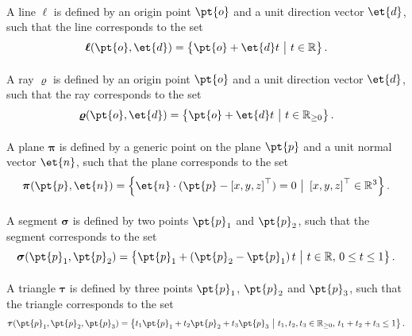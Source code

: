 \paragraph{\Line{}}
A line $\boldsymbol{\ell}$ is defined by an origin point $\pt{o}$ and a unit direction vector $\et{d}$, such that the line corresponds to the set
%
\begin{equation*}
  \boldsymbol{\ell}(\pt{o}, \et{d}) = \left\{ \pt{o} + \et{d} t ~ \big| ~ t \in \mathbb{R} \right\} \text{.}
\end{equation*}

\paragraph{\Ray{}}
A ray $\boldsymbol{\varrho}$ is defined by an origin point $\pt{o}$ and a unit direction vector $\et{d}$, such that the ray corresponds to the set
%
\begin{equation*}
  \boldsymbol{\varrho}(\pt{o}, \et{d}) = \left\{ \pt{o} + \et{d} t ~ \big| ~ t \in \mathbb{R}_{\ge0} \right\} \text{.}
\end{equation*}

\paragraph{\Plane{}}
A plane $\boldsymbol{\pi}$ is defined by a generic point on the plane $\pt{p}$ and a unit normal vector $\et{n}$, such that the plane corresponds to the set
%
\begin{equation*}
  \boldsymbol{\pi}(\pt{p}, \et{n}) = \left\{ \et{n} \cdot (\pt{p} - \left[x, y, z\right]^{\top}) = 0 ~ \big| ~ \left[x, y,  z\right]^{\top} \in \mathbb{R}^3 \right\} \text{.}
\end{equation*}

\paragraph{\Segment{}}
A segment $\boldsymbol{\sigma}$ is defined by two points $\pt{p}_1$ and $\pt{p}_2$, such that the segment corresponds to the set
%
\begin{equation*}
  \boldsymbol{\sigma}(\pt{p}_1, \pt{p}_2) = \left\{ \pt{p}_1 + \left(\pt{p}_2-\pt{p}_1\right)t ~ \big| ~ t \in \mathbb{R}, \, 0 \le t \le 1 \right\} \text{.}
\end{equation*}

\paragraph{\Triangle{}}
A triangle $\boldsymbol{\tau}$ is defined by three points $\pt{p}_1$, $\pt{p}_2$ and $\pt{p}_3$, such that the triangle corresponds to the set
%
\begin{equation*}
  \boldsymbol{\tau}(\pt{p}_1, \pt{p}_2, \pt{p}_3) = \left\{ t_1\pt{p}_1 + t_2\pt{p}_2 + t_3\pt{p}_3 ~ \big| ~ t_1, t_2, t_3 \in \mathbb{R}_{\ge0}, \, t_1 + t_2+t_3 \le 1 \right\} \text{.}
\end{equation*}

